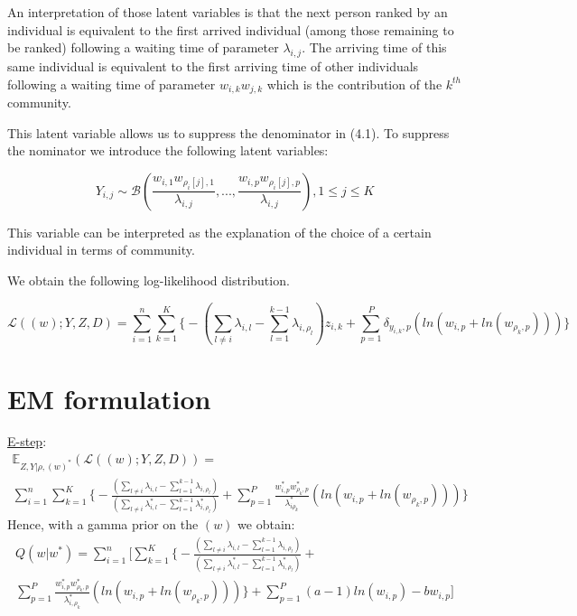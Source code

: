 \documentclass[12pt]{ociamthesis}  %
\begin{document}
	An interpretation of those latent variables is that the next person ranked by an individual is equivalent to the first arrived individual (among those remaining to be ranked) following a waiting time of parameter $\lambda_{i,j}$. The arriving time of this same individual is equivalent to the first arriving time of other individuals following a waiting time of parameter $w_{i,k}w_{j,k}$ which is the contribution of the $k^{th}$ community.
	
	This latent variable allows us to suppress the denominator in (4.1). To suppress the nominator we introduce the following latent variables:
	
	\begin{equation}
	Y_{i,j} \sim \mathcal{B}(\frac{w_{i,1}w_{\rho_{i}[j],1}}{\lambda_{i,j}}, ..., \frac{w_{i,p}w_{\rho_{i}[j],p}}{\lambda_{i,j}}), 1 \leq j \leq K
	\end{equation}
	
	This variable can be interpreted as the explanation of the choice of a certain individual in terms of community.
	
	We obtain the following log-likelihood distribution.
	
	\begin{equation}
	\mathcal{L}((w);Y,Z,D) = \sum_{i = 1}^{n} \sum_{k = 1}^{K} \bigg\{ -(\sum_{l \neq i} \lambda_{i,l} - \sum_{l = 1}^{k - 1} \lambda_{i,\rho_{l}})z_{i,k} + \sum_{p = 1}^{P} \delta_{y_{i,k}, p} (ln(w_{i,p} + ln(w_{\rho_{k},p}))) \bigg\}
	\end{equation}
	
	\section{EM formulation}
	
	\underline{E-step}:
	\begin{multline}
	\mathbb{E}_{Z,Y | \rho, (w)^{*}}(\mathcal{L}((w);Y,Z,D)) = \\ \sum_{i = 1}^{n} \sum_{k = 1}^{K} \bigg\{ -\frac{(\sum_{l \neq i} \lambda_{i,l} - \sum_{l = 1}^{k - 1} \lambda_{i,\rho_{l}})}{(\sum_{l \neq i} \lambda^{*}_{i,l} - \sum_{l = 1}^{k - 1} \lambda^{*}_{i,\rho_{l}})} + \sum_{p = 1}^{P} \frac{w^{*}_{i,p}w^{*}_{\rho_{k},p}}{\lambda^{*}_{i\rho_{k}}} (ln(w_{i,p} + ln(w_{\rho_{k},p}))) \bigg\}
	\end{multline} Hence, with a gamma prior on the $(w)$ we obtain:
	\begin{multline}
	Q(w|w^{*}) = \sum_{i = 1}^{n} \Bigg[ \sum_{k = 1}^{K} \bigg\{ -\frac{(\sum_{l \neq i} \lambda_{i,l} - \sum_{l = 1}^{k - 1} \lambda_{i,\rho_{l}})}{(\sum_{l \neq i} \lambda^{*}_{i,l} - \sum_{l = 1}^{k - 1} \lambda^{*}_{i,\rho_{l}})} + \\ \sum_{p = 1}^{P} \frac{w^{*}_{i,p}w^{*}_{\rho_{k},p}}{\lambda^{*}_{i,\rho_{k}}} (ln(w_{i,p} + ln(w_{\rho_{k},p}))) \bigg\} + \sum_{p = 1}^{P} (a-1)ln(w_{i,p}) - bw_{i,p}  \Bigg]
	\end{multline}
	
\end{document}
